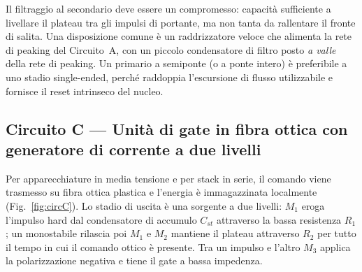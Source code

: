 \documentclass[11pt,a4paper]{article}
\begin{document}
Il filtraggio al secondario deve essere un compromesso: capacità sufficiente a
livellare il plateau tra gli impulsi di portante, ma non tanta da rallentare il
fronte di salita. Una disposizione comune è un raddrizzatore veloce che alimenta la
rete di peaking del Circuito~A, con un piccolo condensatore di filtro posto
\emph{a valle} della rete di peaking. Un primario a semiponte (o a ponte intero) è
preferibile a uno stadio single-ended, perché raddoppia l'escursione di flusso
utilizzabile e fornisce il reset intrinseco del nucleo.

\subsection{Circuito C --- Unità di gate in fibra ottica con generatore di corrente a due livelli}

Per apparecchiature in media tensione e per stack in serie, il comando viene
trasmesso su fibra ottica plastica e l'energia è immagazzinata localmente
(Fig.~\ref{fig:circC}). Lo stadio di uscita è una sorgente a due livelli: $M_1$
eroga l'impulso hard dal condensatore di accumulo $C_{st}$ attraverso la bassa
resistenza $R_1$; un monostabile rilascia poi $M_1$ e $M_2$ mantiene il plateau
attraverso $R_2$ per tutto il tempo in cui il comando ottico è presente. Tra un
impulso e l'altro $M_3$ applica la polarizzazione negativa e tiene il gate a bassa
impedenza.
\end{document}
